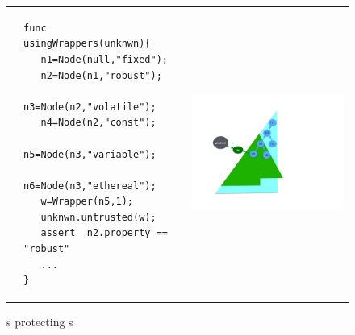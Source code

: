\begin{figure}[htb]
\begin{tabular}{llll}
&
\begin{minipage}{0.50\textwidth}
\begin{lstlisting}
func usingWrappers(unknwn){
   n1=Node(null,"fixed"); 
   n2=Node(n1,"robust"); 
   n3=Node(n2,"volatile"); 
   n4=Node(n2,"const");
   n5=Node(n3,"variable");
   n6=Node(n3,"ethereal");
   w=Wrapper(n5,1);
   unknwn.untrusted(w);
   assert  n2.property == "robust" 
   ...
}
\end{lstlisting}
\end{minipage}
& & 
\begin{minipage}{0.75\textwidth}
\includegraphics[width=\linewidth, trim=145  320 60 105,clip]{diagrams/DOM.pdf}
\end{minipage}
\end{tabular}
 \vspace*{-1mm}
\caption{s protecting s }
\label{fig:WrapperUse}
\end{figure}
 